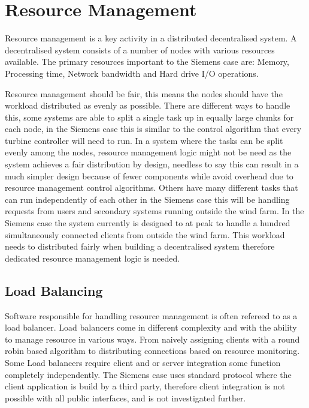 \section{Resource Management} %

Resource management is a key activity in a distributed decentralised system.
A decentralised system consists of a number of nodes with various resources available. 
The primary resources important to the Siemens case are: Memory, Processing time, Network bandwidth and Hard drive I/O operations. %

Resource management should be fair, this means the nodes should have the workload distributed as evenly as possible.
There are different ways to handle this, some systems are able to split a single task up in equally large chunks for each node, in the Siemens case this is similar to the control algorithm that every turbine controller will need to run.
In a system where the tasks can be split evenly among the nodes, resource management logic might not be need as the system achieves a fair distribution by design, needless to say this can result in a much simpler design because of fewer components while avoid overhead due to resource management control algorithms. %
Others have many different tasks that can run independently of each other in the Siemens case this will be handling requests from users and secondary systems running outside the wind farm.
In the Siemens case the system currently is designed to at peak to handle a hundred simultaneously connected clients from outside the wind farm. This workload needs to distributed fairly when building a decentralised system therefore dedicated resource management logic is needed.

\subsection{Load Balancing}
Software responsible for handling resource management is often refereed to as a load balancer.
Load balancers come in different complexity and with the ability to manage resource in various ways.
From naively assigning clients with a round robin based algorithm to distributing connections based on resource monitoring.
Some Load balancers require client and or server integration some function completely independently.
The Siemens case uses standard protocol where the client application is build by a third party,
therefore client integration is not possible with all public interfaces, and is not investigated further.

